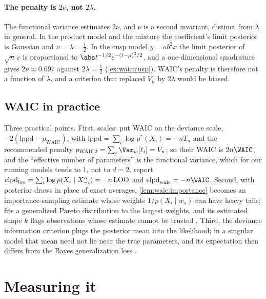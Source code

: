 \begin{refsection}
\paragraph{The penalty is $2\nu$, not $2\lambda$.} The functional variance estimates $2\nu$, and $\nu$ is a second invariant, distinct from $\lambda$ in general. In the product model and the mixture the coefficient's limit posterior is Gaussian and $\nu=\lambda=\tfrac12$. In the cusp model $y=ab^2x$ the limit posterior of $\sqrt n\,c$ is proportional to $\abs t^{-1/2}e^{-(t-\mu)^2/2}$, and a one-dimensional quadrature gives $2\nu\approx0.697$ against $2\lambda=\tfrac12$ (\cref{ex:waic:cusp}). WAIC's penalty is therefore not a function of $\lambda$, and a criterion that replaced $V_n$ by $2\lambda$ would be biased.

\subsection{WAIC in practice}\label{sec:waic:practice}

Three practical points. First, scales: \textcite{GelmanEtAl2014} put WAIC on the deviance scale, $-2(\mathrm{lppd}-p_{\mathrm{WAIC}})$, with $\mathrm{lppd}=\sum_i\log p^*(X_i)=-nT_n$ and the recommended penalty $p_{\mathrm{WAIC}2}=\sum_i\Var_w[\ell_i]=V_n$; so their WAIC is $2n\WAIC$, and the ``effective number of parameters'' is the functional variance, which for our running models tends to $1$, not to $d=2$. \textcite{VehtariEtAl2017} report $\mathrm{elpd}_{\mathrm{loo}}=\sum_i\log p(X_i\mid X^n_{-i})=-n\,\mathrm{LOO}$ and $\mathrm{elpd}_{\mathrm{waic}}=-n\WAIC$. Second, with posterior draws in place of exact averages, \cref{lem:waic:importance} becomes an importance-sampling estimate whose weights $1/p(X_i\mid w_s)$ can have heavy tails;  fits a generalized Pareto distribution to the largest weights, and its estimated shape $\hat k$ flags observations whose estimate cannot be trusted \parencite{VehtariEtAl2017,VehtariEtAl2024}. Third, the deviance information criterion \parencite{SpiegelhalterEtAl2002} plugs the posterior mean into the likelihood; in a singular model that mean need not lie near the true parameters, and its expectation then differs from the Bayes generalization loss \parencite[Section~5.3]{Watanabe2010}.

\section{Measuring it}\label{sec:waic:measure}


\end{refsection}
